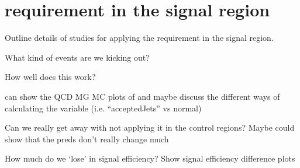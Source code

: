 
\chapter{\dphistar requirement in the signal region}

Outline details of studies for applying the \dphistar requirement in the
signal region.

What kind of events are we kicking out?

How well does this work?

can show the QCD MG MC plots of \dphistar and maybe discuss the different ways 
of calculating the variable (i.e. ``acceptedJets'' vs normal)

Can we really get away with not applying it in the control regions?
    Maybe could show that the preds don't really change much

How much do we `lose' in signal efficiency? Show signal efficiency difference 
plots
